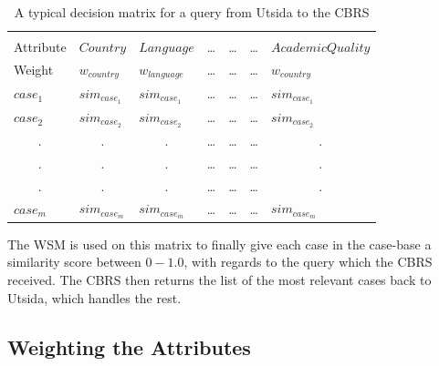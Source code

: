 \begin{table}[h]
\centering
\caption{A typical decision matrix for a query from Utsida to the CBRS}
\label{tab:decision_matrix}
\begin{tabular}{lllcccl}
                      &                       &                       & \multicolumn{1}{l}{} & \multicolumn{1}{l}{} & \multicolumn{1}{l}{} &                       \\
Attribute             & $Country$             & $Language$            & \ldots               & \ldots               & \ldots               & $AcademicQuality$     \\\hline
Weight                & $w_{country}$         & $w_{language}$        & \ldots               & \ldots               & \ldots               & $w_{country}$         \\\hline
$case_{1}$            & $sim_{case_{1}}$      & $sim_{case_{1}}$      & \ldots               & \ldots               & \ldots               & $sim_{case_{1}}$      \\
$case_{2}$            & $sim_{case_{2}}$      & $sim_{case_{2}}$      & \ldots               & \ldots               & \ldots               & $sim_{case_{2}}$      \\
\multicolumn{1}{c}{.} & \multicolumn{1}{c}{.} & \multicolumn{1}{c}{.} & \ldots               & \ldots               & \ldots               & \multicolumn{1}{c}{.} \\
\multicolumn{1}{c}{.} & \multicolumn{1}{c}{.} & \multicolumn{1}{c}{.} & \ldots               & \ldots               & \ldots               & \multicolumn{1}{c}{.} \\
\multicolumn{1}{c}{.} & \multicolumn{1}{c}{.} & \multicolumn{1}{c}{.} & \ldots               & \ldots               & \ldots               & \multicolumn{1}{c}{.} \\
$case_{m}$            & $sim_{case_{m}}$      & $sim_{case_{m}}$      & \ldots               & \ldots               & \ldots               & $sim_{case_{m}}$     
\end{tabular}
\end{table}

The WSM is used on this matrix to finally give each case in the case-base a similarity score between $0-1.0$, with regards to the query which the CBRS received. The CBRS then returns the list of the most relevant cases back to Utsida, which handles the rest.


\subsection{Weighting the Attributes}


